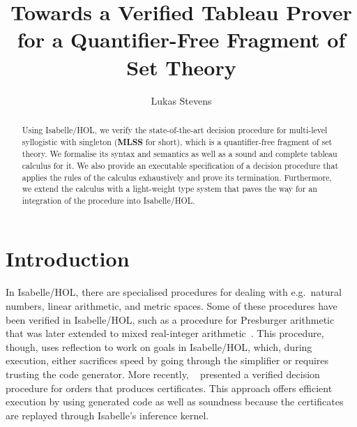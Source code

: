 \documentclass[runningheads]{llncs}
\newcommand{\MLSS}{\textbf{MLSS}}
\begin{document}

\setcounter{tocdepth}{1}

\title{Towards a Verified Tableau Prover for a Quantifier-Free Fragment of Set Theory}
\author{Lukas Stevens}

\maketitle

\begin{abstract}
  Using Isabelle/HOL, we verify the state-of-the-art decision procedure for multi-level syllogistic with singleton (\MLSS{} for short), which is a quantifier-free fragment of set theory.
  We formalise its syntax and semantics as well as a sound and complete tableau calculus for it.
  We also provide an executable specification of a decision procedure that applies the rules of the calculus exhaustively and prove its termination.
  Furthermore, we extend the calculus with a light-weight type system that paves the way for an integration of the procedure into Isabelle/HOL.
\end{abstract}

\section{Introduction}
In Isabelle/HOL, there are specialised procedures for dealing with e.g.\ natural numbers, linear arithmetic, and metric spaces.
Some of these procedures have been verified in Isabelle/HOL, such as a procedure for Presburger arithmetic~\cite{presburger} that was later extended to mixed real-integer arithmetic~\cite{arithmetic}.
This procedure, though, uses reflection to work on goals in Isabelle/HOL, which, during execution, either sacrifices speed by going through the simplifier or requires trusting the code generator.
More recently, \citeauthor{orders}~\cite{orders} presented a verified decision procedure for orders that produces certificates. 
This approach offers efficient execution by using generated code as well as soundness because the certificates are replayed through Isabelle's inference kernel.
\end{document}
